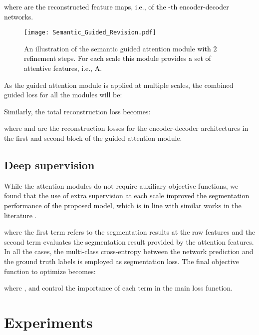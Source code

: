 \documentclass[journal]{IEEEtran}
\begin{document}
\textcolor{black}{where  are the reconstructed feature maps, i.e.,  of the -th encoder-decoder networks. }

\begin{figure}[h!]
    \centering
    \texttt{[image: Semantic\_Guided\_Revision.pdf]}
    \caption{An illustration of the semantic guided attention module \textcolor{black}{with 2 refinement steps. For each scale  this module provides a set of attentive features, i.e., A.}}
    \label{fig:guidedModule}
\end{figure}





As the guided attention module is applied at multiple scales, the combined guided loss for all the modules will be:



Similarly, the total reconstruction loss becomes:



where  and \textcolor{black}{} are the reconstruction losses for the encoder-decoder architectures in the first and second block of the guided attention module.



\subsection{Deep supervision}

While the attention modules do not require auxiliary objective functions, we found that the use of extra supervision at each scale \cite{lee2015deeply} \textcolor{black}{improved the segmentation performance of the proposed model}, which is in line with similar works in the literature \cite{chen2016attention,wang18d,schlemper2019attention}. 



where the first term refers to the segmentation results at the raw features  and the second term evaluates the segmentation result provided by the attention features. In all the cases, the multi-class cross-entropy between the network prediction and the ground truth labels is employed as segmentation loss. The final objective function to optimize becomes:





where ,  and  control the importance of each term in the main loss function.

\section{Experiments}
\label{sec:Experiments}
\end{document}
